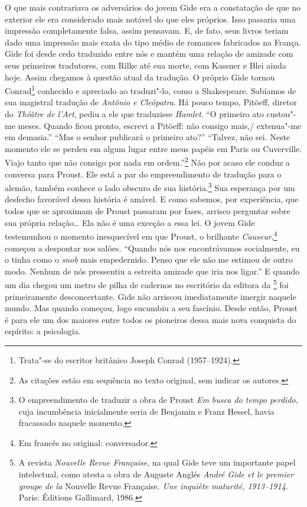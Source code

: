 O que mais contrariava os adversários do jovem Gide era a constatação de
que no exterior ele era considerado mais notável do que eles próprios.
Isso passaria uma impressão completamente falsa, assim pensavam.
E, de fato, seus livros teriam dado uma impressão mais exata do tipo médio de romances fabricados na França. Gide foi
desde cedo traduzido entre nós e mantém uma relação de amizade com seus
primeiros tradutores, com Rilke até sua morte, com Kassner e Blei ainda
hoje. Assim chegamos à questão atual da tradução. O próprio Gide
tornou Conrad\footnote{Trata"-se do escritor britânico Joseph
  Conrad (1957--1924). \versal{[N.~O.]}} conhecido e apreciado ao traduzi"-lo, como a Shakespeare. Sabíamos de sua magistral tradução de
\emph{Antônio e Cleópatra}. Há pouco tempo, Pitöeff, diretor do
\emph{Théâtre de l'Art}, pediu a ele que traduzisse \emph{Hamlet}.
``O primeiro ato custou"-me meses. Quando ficou pronto, escrevi a
Pitöeff: não consigo mais,/ extenua"-me em demasia.'' ``Mas o senhor
publicará o primeiro ato?'' ``Talvez, não sei. Neste momento ele se
perdeu em algum lugar entre meus papéis em Paris ou Cuverville. Viajo
tanto que não consigo por nada em ordem.''\footnote{As citações
  estão em sequência no texto original, sem indicar os autores. \versal{[N.~T.]}} Não por acaso ele conduz a conversa para Proust. Ele está a
par do empreendimento de tradução para o alemão, também conhece o lado
obscuro de sua história.\footnote{O empreendimento de traduzir a
  obra de Proust \emph{Em busca do tempo perdido}, cuja incumbência
  inicialmente seria de Benjamin e Franz Hessel, havia fracassado
  naquele momento. \versal{[N.~T.]}} Sua esperança por um desfecho
favorável dessa história é amável. E como sabemos, por experiência, que todos
que se aproximam de Proust passaram por fases, arrisco
perguntar sobre sua própria relação\ldots{} Ela não é uma exceção a essa lei.
O jovem Gide testemunhou o momento inesquecível em que Proust, o
brilhante \emph{Causeur},\footnote{Em francês no original: conversador. \versal{[N.~T.]}} começou
a despontar nos salões. ``Quando nós nos encontrávamos socialmente, eu o
tinha como o \emph{snob} mais empedernido. Penso que ele não me
estimou de outro modo. Nenhum de nós pressentiu a estreita amizade que
iria nos ligar.'' E quando um dia chegou um metro de pilha de cadernos
no escritório da editora da \footnote{A revista
  \emph{Nouvelle Revue Française}, na qual Gide teve um importante papel
  intelectual, como atesta a obra de Auguste Anglés \emph{André Gide et
  le premier groupe de la} Nouvelle Revue Française. \emph{Une inquiète
  maturité, 1913--1914}. Paris: Éditions Gallimard, 1986. \versal{[N.~T.]}} foi
primeiramente desconcertante. Gide não arriscou imediatamente imergir
naquele mundo. Mas quando começou, logo sucumbiu a seu fascínio. Desde
então, Proust é para ele um dos maiores entre todos os pioneiros dessa
mais nova conquista do espírito: a psicologia.


